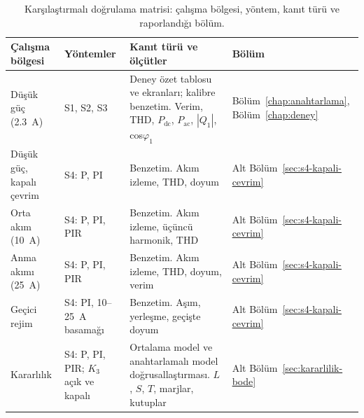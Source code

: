 \begin{table}[htbp]
  \centering
  \caption{Karşılaştırmalı doğrulama matrisi: çalışma bölgesi, yöntem, kanıt türü ve raporlandığı bölüm.}
  \label{tab:dogrulama-matrisi}
  \small
  \begin{tabularx}{\textwidth}{p{} p{} X p{}}
    \toprule
    Çalışma bölgesi & Yöntemler & Kanıt türü ve ölçütler & Bölüm \\
    \midrule
    Düşük güç (\SI{2.3}{\ampere}) & S1, S2, S3 & Deney özet tablosu ve ekranları; kalibre benzetim. Verim, THD, $P_{\mathrm{dc}}$, $P_{\mathrm{ac}}$, $|Q_1|$, cos$\varphi_1$ & Bölüm~\ref{chap:anahtarlama}, Bölüm~\ref{chap:deney} \\
    Düşük güç, kapalı çevrim & S4: P, PI & Benzetim. Akım izleme, THD, doyum & Alt Bölüm~\ref{sec:s4-kapali-cevrim} \\
    Orta akım (\SI{10}{\ampere}) & S4: P, PI, PIR & Benzetim. Akım izleme, üçüncü harmonik, THD & Alt Bölüm~\ref{sec:s4-kapali-cevrim} \\
    Anma akımı (\SI{25}{\ampere}) & S4: P, PI, PIR & Benzetim. Akım izleme, THD, doyum, verim & Alt Bölüm~\ref{sec:s4-kapali-cevrim} \\
    Geçici rejim & S4: PI, \num{10}--\SI{25}{\ampere} basamağı & Benzetim. Aşım, yerleşme, geçişte doyum & Alt Bölüm~\ref{sec:s4-kapali-cevrim} \\
    Kararlılık & S4: P, PI, PIR; $K_3$ açık ve kapalı & Ortalama model ve anahtarlamalı model doğrusallaştırması. $L$, $S$, $T$, marjlar, kutuplar & Alt Bölüm~\ref{sec:kararlilik-bode} \\
    \bottomrule
  \end{tabularx}
\end{table}

